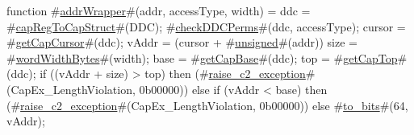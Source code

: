 function #\hyperref[zaddrWrapper]{addrWrapper}#(addr, accessType, width) =
  {
    ddc    = #\hyperref[zcapRegToCapStruct]{capRegToCapStruct}#(DDC);
    #\hyperref[zcheckDDCPerms]{checkDDCPerms}#(ddc, accessType);
    cursor = #\hyperref[zgetCapCursor]{getCapCursor}#(ddc);
    vAddr  = (cursor + #\hyperref[zunsigned]{unsigned}#(addr)) %
    size   = #\hyperref[zwordWidthBytes]{wordWidthBytes}#(width);
    base   = #\hyperref[zgetCapBase]{getCapBase}#(ddc);
    top    = #\hyperref[zgetCapTop]{getCapTop}#(ddc);
    if ((vAddr + size) > top) then
      (#\hyperref[zraisezyctwozyexception]{raise\_c2\_exception}#(CapEx_LengthViolation, 0b00000))
    else if (vAddr < base) then
      (#\hyperref[zraisezyctwozyexception]{raise\_c2\_exception}#(CapEx_LengthViolation, 0b00000))
    else
      #\hyperref[ztozybits]{to\_bits}#(64, vAddr);
  }
